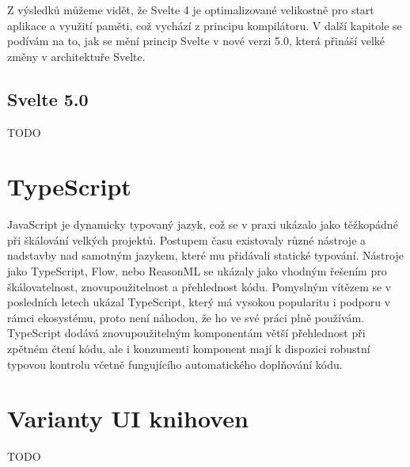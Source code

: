 Z výsledků můžeme vidět, že Svelte 4 je optimalizované velikostně pro start aplikace a využití paměti, což vychází z principu kompilátoru.
V další kapitole se podívám na to, jak se mění princip Svelte v nové verzi 5.0, která přináší velké změny v architektuře Svelte.

\subsection{Svelte 5.0}

TODO

\section{TypeScript}

JavaScript je dynamicky typovaný jazyk, což se v praxi ukázalo jako těžkopádné při škálování velkých projektů.
Postupem času existovaly různé nástroje a nadstavby nad samotným jazykem, které mu přidávali statické typování.
Nástroje jako TypeScript, Flow, nebo ReasonML se ukázaly jako vhodným řešením pro škálovatelnost, znovupoužitelnost a přehlednost kódu.
Pomyslným vítězem se v posledních letech ukázal TypeScript, který má vysokou popularitu i podporu v rámci ekosystému, proto není náhodou, že ho ve své práci plně používám.
TypeScript dodává znovupoužitelným komponentám větší přehlednost při zpětném čtení kódu, ale i konzumenti komponent mají k dispozici robustní typovou kontrolu včetně fungujícího automatického doplňování kódu.

\section{Varianty UI knihoven}

TODO
